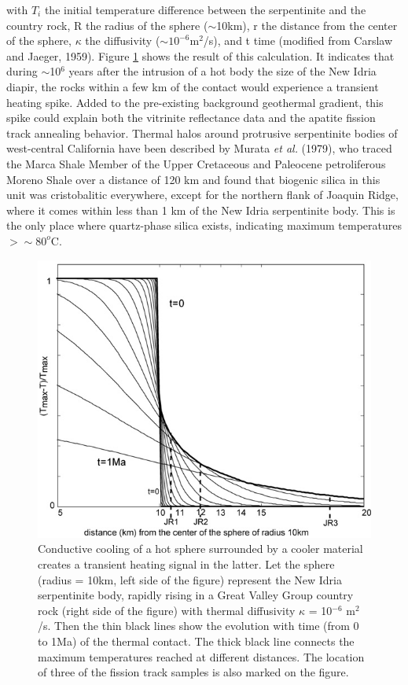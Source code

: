 \documentclass[11pt,twoside]{article}
\begin{document}
with $T_i$ the initial temperature difference between the serpentinite
and the country  rock, R the radius of the  sphere ($\sim$10km), r the
distance  from the  center  of the  sphere,  $\kappa$ the  diffusivity
($\sim 10^{-6}$m$^2$/s), and t time (modified from Carslaw and Jaeger,
1959).   Figure  \ref{fig:thermalmodel}   shows  the  result  of  this
calculation.  It  indicates that  during $\sim$10$^6$ years  after the
intrusion of  a hot body the size  of the New Idria  diapir, the rocks
within a  few km of the  contact would experience  a transient heating
spike.  Added to the pre-existing background geothermal gradient, this
spike  could  explain both  the  vitrinite  reflectance  data and  the
apatite  fission  track  annealing  behavior.   Thermal  halos  around
protrusive  serpentinite bodies of  west-central California  have been
described by Murata  {\it et al.}  (1979), who  traced the Marca Shale
Member  of the  Upper  Cretaceous and  Paleocene petroliferous  Moreno
Shale over a distance of 120 km and found that biogenic silica in this
unit was  cristobalitic everywhere, except  for the northern  flank of
Joaquin Ridge, where  it comes within less than 1 km  of the New Idria
serpentinite body.  This is the  only place where  quartz-phase silica
exists, indicating maximum temperatures $> \sim 80^o$C.\\

\begin{figure}[here]
  \includegraphics[width=400pt]{thermalmodel.jpg}
  \caption{
Conductive cooling  of a  hot sphere surrounded  by a  cooler material
creates  a transient  heating signal  in the  latter.  Let  the sphere
(radius  = 10km,  left side  of the  figure) represent  the  New Idria
serpentinite body, rapidly rising in a Great Valley Group country rock
(right  side  of  the  figure)  with thermal  diffusivity  $\kappa$  =
10$^{-6}$ m$^2$/s. Then  the thin black lines show  the evolution with
time (from  0 to 1Ma)  of the thermal  contact.  The thick  black line
connects the maximum temperatures  reached at different distances. The
location of three  of the fission track samples is  also marked on the
figure.}
\label{fig:thermalmodel}
\end{figure}
\end{document}
